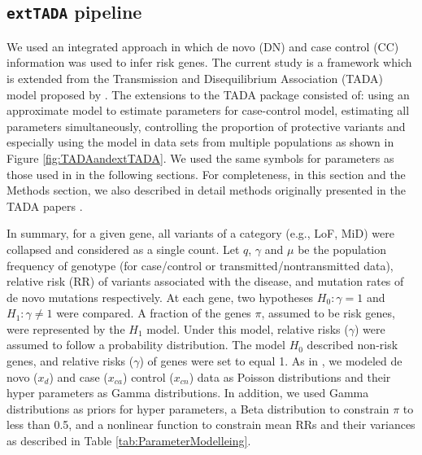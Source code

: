 \documentclass[]{article}
\begin{document}
\subsection{\texttt{extTADA} pipeline}

We used an integrated approach in which de novo (DN) and case control (CC)
information was used to infer risk genes. The current study is a
framework which is extended from the Transmission and Disequilibrium
Association (TADA) model proposed by
\cite{he2013integrated, de2014synaptic}. The extensions to
the TADA package consisted of: using an approximate model to estimate parameters
for case-control model, estimating all parameters simultaneously,
controlling the proportion of protective variants and especially using
the model in data sets from multiple populations as shown in Figure \ref{fig:TADAandextTADA}. We used the same
symbols for parameters as those used in \cite{he2013integrated, de2014synaptic} in the following
sections. For completeness, in this section and the Methods section, we also described in detail methods originally presented in the TADA papers \citep{he2013integrated,de2014synaptic}.


In summary, for a given gene, all variants of a category
(e.g., LoF, MiD) were collapsed and considered as a
single count. Let $q$, $\gamma$ and $\mu$ be the population frequency of
genotype (for case/control or transmitted/nontransmitted data),
relative risk (RR) of variants associated with the disease, and
mutation rates of de novo mutations respectively.
At each gene, two hypotheses $H_0:
  \gamma = 1$ and $H_1: \gamma \neq 1$ were compared. A fraction of the genes $\pi$, assumed to be risk genes, were represented by the $H_1$ model. Under this model, relative
  risks ($\gamma$) were assumed to follow a probability distribution.
The model $H_0$ described non-risk genes, and relative risks ($\gamma$)
  of genes were set to equal 1. As in
  \cite{he2013integrated}, we modeled de novo ($x_d$) and case
  ($x_{ca}$) control ($x_{cn}$) data as Poisson distributions and
  their hyper parameters as Gamma distributions. In addition, we
  used Gamma distributions as priors for hyper parameters, a Beta
  distribution to constrain $\pi$ to less than 0.5, and a
  nonlinear function to constrain mean RRs and their variances as described in Table
  \ref{tab:ParameterModelleing}.
\end{document}
